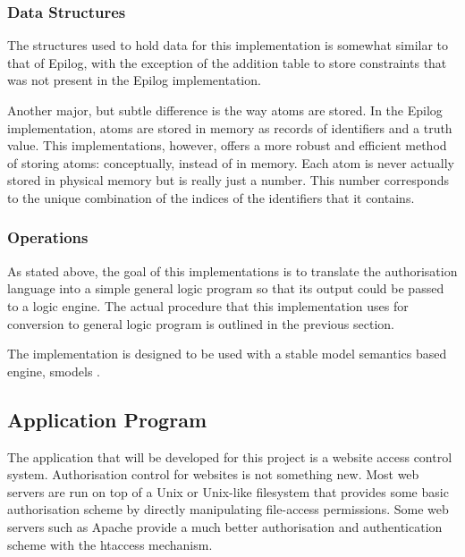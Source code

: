\documentclass[a4paper]{article}
\begin{document}
      \subsubsection{Data Structures}

        The structures used to hold data for this implementation is somewhat
        similar to that of Epilog, with the exception of the addition table
        to store constraints that was not present in the Epilog implementation.

        Another major, but subtle difference is the way atoms are stored. In 
        the Epilog implementation, atoms are stored in memory as records of
        identifiers and a truth value. This implementations, however, offers
        a more robust and efficient method of storing atoms: conceptually,
        instead of in memory. Each atom is never actually stored in physical
        memory but is really just a number. This number corresponds to the
        unique combination of the indices of the identifiers that it contains.

      \subsubsection{Operations}

        As stated above, the goal of this implementations is to translate
        the authorisation language into a simple general logic program
        so that its output could be passed to a logic engine. The actual
        procedure that this implementation uses for conversion to general
        logic program is outlined in the previous section.

        The implementation is designed to be used with a stable model
        semantics based engine, smodels \cite{S}.

    \subsection{Application Program}

      The application that will be developed for this project is a website 
      access control system. Authorisation control for websites is not 
      something new. Most web servers are run on top of a Unix or Unix-like
      filesystem that provides some basic authorisation scheme by directly
      manipulating file-access permissions. Some web servers such as Apache
      provide a much better authorisation and authentication scheme with
      the htaccess mechanism.
\end{document}
